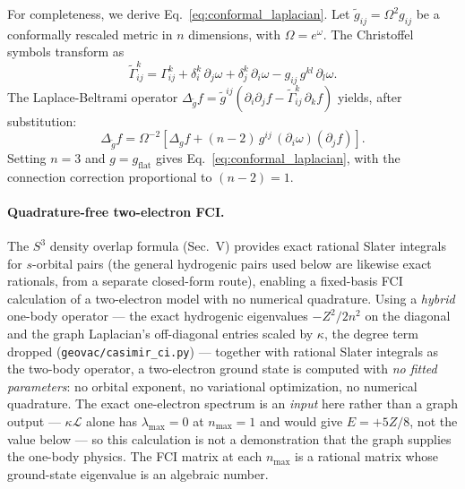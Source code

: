 \documentclass[aps,pra,twocolumn,superscriptaddress,longbibliography]{revtex4-2}
\begin{document}
For completeness, we derive Eq.~\eqref{eq:conformal_laplacian}. Let $\tilde{g}_{ij} = \Omega^2 g_{ij}$ be a conformally rescaled metric in $n$ dimensions, with $\Omega = e^\omega$. The Christoffel symbols transform as
\begin{equation}
\tilde{\Gamma}^k_{ij} = \Gamma^k_{ij} + \delta^k_i\, \partial_j \omega + \delta^k_j\, \partial_i \omega - g_{ij}\, g^{kl}\, \partial_l \omega.
\end{equation}
The Laplace-Beltrami operator $\Delta_{\tilde{g}} f = \tilde{g}^{ij}\left(\partial_i \partial_j f - \tilde{\Gamma}^k_{ij}\, \partial_k f\right)$ yields, after substitution:
\begin{equation}
\Delta_{\tilde{g}} f = \Omega^{-2}\left[\Delta_g f + (n-2)\, g^{ij}\, (\partial_i \omega)(\partial_j f)\right].
\end{equation}
Setting $n = 3$ and $g = g_{\text{flat}}$ gives Eq.~\eqref{eq:conformal_laplacian}, with the connection correction proportional to $(n - 2) = 1$.

\paragraph{Quadrature-free two-electron FCI.}
The $S^3$ density overlap formula (Sec.~V) provides exact rational
Slater integrals for $s$-orbital pairs (the general hydrogenic pairs used
below are likewise exact rationals, from a separate closed-form route),
enabling a
fixed-basis FCI calculation of a two-electron model with no numerical quadrature.  Using a \emph{hybrid} one-body operator --- the exact hydrogenic
eigenvalues $-Z^2/2n^2$ on the diagonal and the graph Laplacian's
off-diagonal entries scaled by $\kappa$, the degree term dropped
(\texttt{geovac/casimir\_ci.py}) --- together with rational Slater integrals as
the two-body operator, a two-electron ground state is computed with \emph{no fitted
parameters}: no orbital exponent, no variational optimization, no numerical
quadrature.  The exact one-electron spectrum is an \emph{input} here rather
than a graph output --- $\kappa\mathcal{L}$ alone has $\lambda_{\max} = 0$ at
$n_{\max} = 1$ and would give $E = +5Z/8$, not the value below --- so this
calculation is not a demonstration that the graph supplies the one-body
physics.  The FCI matrix at each
$n_{\max}$ is a rational matrix whose ground-state eigenvalue is an
algebraic number.
\end{document}
